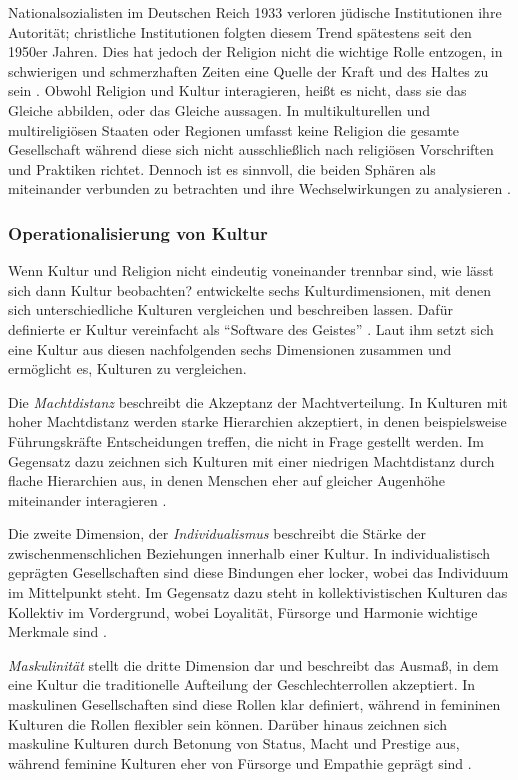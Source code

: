 Nationalsozialisten im Deutschen Reich 1933 verloren jüdische Institutionen ihre Autorität; christliche Institutionen folgten diesem Trend spätestens seit den 1950er Jahren. Dies hat jedoch der Religion nicht die wichtige Rolle entzogen, in schwierigen und schmerzhaften Zeiten eine Quelle der Kraft und des Haltes zu sein \parencite{ReligionCultureandCommunication}. Obwohl Religion und Kultur interagieren, heißt es nicht, dass sie das Gleiche abbilden, oder das Gleiche aussagen. In multikulturellen und multireligiösen Staaten oder Regionen umfasst keine Religion die gesamte Gesellschaft während diese sich nicht ausschließlich nach religiösen Vorschriften und Praktiken richtet. Dennoch ist es sinnvoll, die beiden Sphären als miteinander verbunden zu betrachten und ihre Wechselwirkungen zu analysieren \parencite{McGlinchey}.

\subsubsection{Operationalisierung von Kultur}    \label{subsubsec_2.1.2.1}
Wenn Kultur und Religion nicht eindeutig voneinander trennbar sind, wie lässt sich dann Kultur beobachten? \textcite{HofstedeOG} entwickelte sechs Kulturdimensionen, mit denen sich unterschiedliche Kulturen vergleichen und beschreiben lassen. Dafür definierte er Kultur vereinfacht als \enquote{Software des Geistes} \parencite[S. 209]{HofstedeOG}. Laut ihm setzt sich eine Kultur aus diesen nachfolgenden sechs Dimensionen zusammen und ermöglicht es, Kulturen zu vergleichen.

Die \textit{Machtdistanz} beschreibt die Akzeptanz der Machtverteilung. In Kulturen mit hoher Machtdistanz werden starke Hierarchien akzeptiert, in denen beispielsweise Führungskräfte Entscheidungen treffen, die nicht in Frage gestellt werden. Im Gegensatz dazu zeichnen sich Kulturen mit einer niedrigen Machtdistanz durch flache Hierarchien aus, in denen Menschen eher auf gleicher Augenhöhe miteinander interagieren \parencite{HofstedeFocus}.

Die zweite Dimension, der \textit{Individualismus} beschreibt die Stärke der zwischenmenschlichen Beziehungen innerhalb einer Kultur. In individualistisch geprägten Gesellschaften sind diese Bindungen eher locker, wobei das Individuum im Mittelpunkt steht. Im Gegensatz dazu steht in kollektivistischen Kulturen das Kollektiv im Vordergrund, wobei Loyalität, Fürsorge und Harmonie wichtige Merkmale sind \parencite{HofstedeFocus}.

\textit{Maskulinität} stellt die dritte Dimension dar und beschreibt das Ausmaß, in dem eine Kultur die traditionelle Aufteilung der Geschlechterrollen akzeptiert. In maskulinen Gesellschaften sind diese Rollen klar definiert, während in femininen Kulturen die Rollen flexibler sein können. Darüber hinaus zeichnen sich maskuline Kulturen durch Betonung von Status, Macht und Prestige aus, während feminine Kulturen eher von Fürsorge und Empathie geprägt sind \parencite{HofstedeFocus}.

